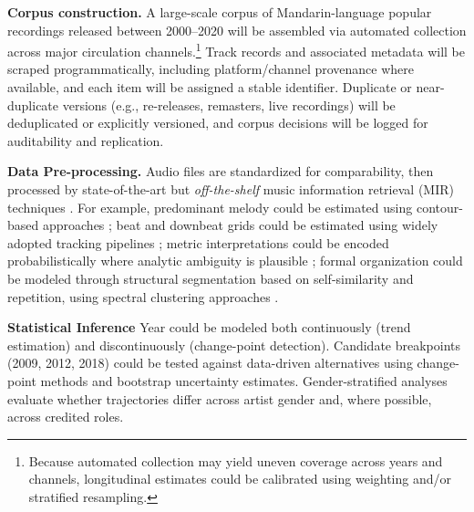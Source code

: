 \documentclass[11pt]{article}
\begin{document}
\textbf{Corpus construction.}
A large-scale corpus of Mandarin-language popular recordings released between 2000--2020 will be assembled via automated collection across major circulation channels.\footnote{Because automated collection may yield uneven coverage across years and channels, longitudinal estimates could be calibrated using weighting and/or stratified resampling.} Track records and associated metadata will be scraped programmatically, including platform/channel provenance where available, and each item will be assigned a stable identifier. Duplicate or near-duplicate versions (e.g., re-releases, remasters, live recordings) will be deduplicated or explicitly versioned, and corpus decisions will be logged for auditability and replication.


\textbf{Data Pre-processing.} 
Audio files are standardized for comparability, then processed by state-of-the-art but \emph{off-the-shelf} music information retrieval (MIR) techniques \citep{mcfee2014structure,mcfee2015librosa,nieto2020structure,declercq2016measuring,burgoyne2011chord}.
For example, predominant melody could be estimated using contour-based approaches \citep{salamon2012melody}; beat and downbeat grids could be estimated using widely adopted tracking pipelines \citep{bock2016madmom}; metric interpretations could be encoded probabilistically where analytic ambiguity is plausible \citep{declercq2016measuring}; formal organization could be modeled through structural segmentation based on self-similarity and repetition, using spectral clustering approaches \citep{mcfee2014structure,nieto2020structure}. 




\textbf{Statistical Inference}
Year could be modeled both continuously (trend estimation) and discontinuously (change-point detection). Candidate breakpoints (2009, 2012, 2018) could be tested against data-driven alternatives using change-point methods and bootstrap uncertainty estimates. Gender-stratified analyses evaluate whether trajectories differ across artist gender and, where possible, across credited roles. 

\end{document}
